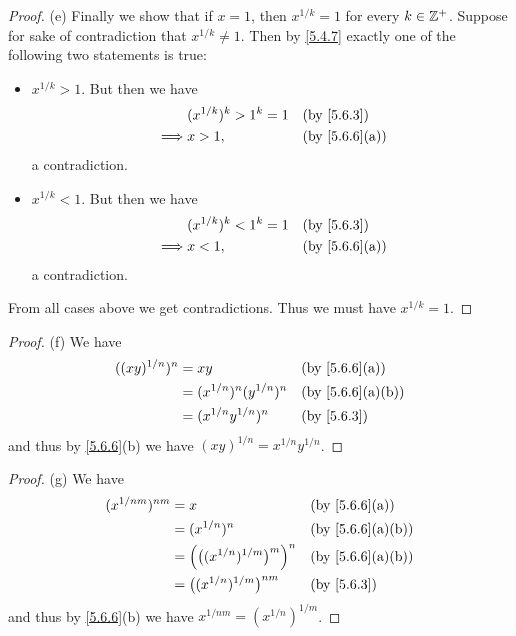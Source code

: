 \begin{proof}{(e)}
  Finally we show that if \(x = 1\), then \(x^{1 / k} = 1\) for every \(k \in \mathbb{Z}^+\).
  Suppose for sake of contradiction that \(x^{1 / k} \neq 1\).
  Then by \cref{5.4.7} exactly one of the following two statements is true:
  \begin{itemize}
    \item \(x^{1 / k} > 1\).
          But then we have
          \begin{align*}
                     & (x^{1 / k})^k > 1^k = 1 &  & \by{5.6.3}                  \\
            \implies & x > 1,                  &  & \text{(by \cref{5.6.6}(a))}
          \end{align*}
          a contradiction.
    \item \(x^{1 / k} < 1\).
          But then we have
          \begin{align*}
                     & (x^{1 / k})^k < 1^k = 1 &  & \by{5.6.3}                  \\
            \implies & x < 1,                  &  & \text{(by \cref{5.6.6}(a))}
          \end{align*}
          a contradiction.
  \end{itemize}
  From all cases above we get contradictions.
  Thus we must have \(x^{1 / k} = 1\).
\end{proof}

\begin{proof}{(f)}
  We have
  \begin{align*}
    ((xy)^{1 / n})^n & = xy                          &  & \text{(by \cref{5.6.6}(a))}    \\
                     & = (x^{1 / n})^n (y^{1 / n})^n &  & \text{(by \cref{5.6.6}(a)(b))} \\
                     & = (x^{1 / n} y^{1 / n})^n     &  & \by{5.6.3}
  \end{align*}
  and thus by \cref{5.6.6}(b) we have \((xy)^{1 / n} = x^{1 / n} y^{1 / n}\).
\end{proof}

\begin{proof}{(g)}
  We have
  \begin{align*}
    (x^{1 / nm})^{nm} & = x                                           &  & \text{(by \cref{5.6.6}(a))}    \\
                      & = (x^{1 / n})^n                               &  & \text{(by \cref{5.6.6}(a)(b))} \\
                      & = \Big(\big((x^{1 / n})^{1 / m}\big)^m\Big)^n &  & \text{(by \cref{5.6.6}(a)(b))} \\
                      & = \big((x^{1 / n})^{1 / m}\big)^{nm}          &  & \by{5.6.3}
  \end{align*}
  and thus by \cref{5.6.6}(b) we have \(x^{1 / nm} = (x^{1 / n})^{1 / m}\).
\end{proof}

